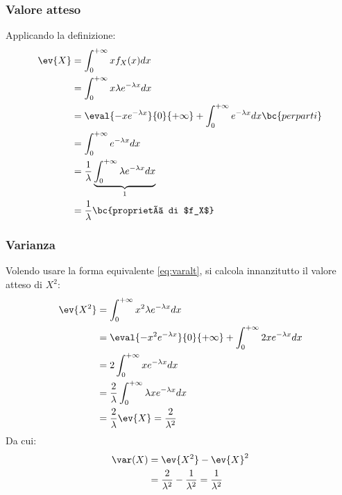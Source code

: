 \subsubsection{Valore atteso}
Applicando la definizione:
\begin{align*}
	\ev{X} & = \int_0^{+\infty} x f_X(x) dx                                                             \\
	       & = \int_0^{+\infty} x\lambda e^{-\lambda x}dx                                               \\
	       & = \eval{-x e^{-\lambda x}}{0}{+\infty} + \int_0^{+\infty} e^{-\lambda x} dx \bc{per parti} \\
	       & = \int_0^{+\infty} e^{-\lambda x} dx                                                       \\
	       & = \frac{1}{\lambda} \underbrace{\int_0^{+\infty} \lambda e^{-\lambda x} dx}_{1}            \\
	       & = \frac{1}{\lambda} \bc{proprietà di $f_X$}
\end{align*}


\subsubsection{Varianza}
Volendo usare la forma equivalente \eqref{eq:varalt}, si calcola innanzitutto il valore atteso di $X^2$:
\begin{align*}
	\ev{X^2} & = \int_0^{+\infty} x^2\lambda e^{-\lambda x} dx                                 \\
	         & = \eval{-x^2 e^{-\lambda x}}{0}{+\infty} + \int_0^{+\infty} 2xe^{-\lambda x} dx \\
	         & = 2\int_0^{+\infty} xe^{-\lambda x}dx                                           \\
	         & = \frac{2}{\lambda} \int_0^{+\infty} \lambda xe^{-\lambda x}dx                  \\
	         & = \frac{2}{\lambda} \ev{X} = \frac{2}{\lambda^2}
\end{align*}
Da cui:
\begin{align*}
	\var(X) & = \ev{X^2} - \ev{X}^2                                           \\
	        & = \frac{2}{\lambda^2}-\frac{1}{\lambda^2} = \frac{1}{\lambda^2}
\end{align*}


